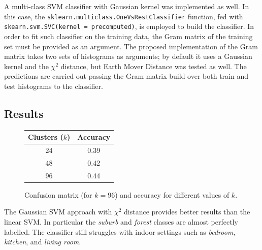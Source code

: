 \documentclass[12pt]{article}
\begin{document}
  A multi-class SVM classifier with Gaussian kernel was implemented as well. In this case, the \texttt{sklearn.multiclass.OneVsRestClassifier} function, fed with \texttt{skearn.svm.SVC(kernel = precomputed)}, is employed to build the classifier. In order to fit such classifier on the training data, the Gram matrix of the training set must be provided as an argument. The proposed implementation of the Gram matrix takes two sets of histograms as arguments; by default it uses a Gaussian kernel and the \( \chi^2 \) distance, but Earth Mover Distance was tested as well. The predictions are carried out passing the Gram matrix build over both train and test histograms to the classifier.


  \subsection*{Results}

  \begin{figure}[H]
    \centering
    \caption*{Confusion matrix (for \( k = 96 \)) and accuracy for different values of \( k \).}
    \quad\quad\quad
    \begin{tabular}[b]{cc}
			\toprule
      Clusters (\( k \)) & Accuracy \\
      \midrule
      24  & 0.39 \\
      48  & 0.42 \\
      96  & 0.44 \\
      \bottomrule
    \end{tabular}
  \end{figure}

  The Gaussian SVM approach with \( \chi^2 \) distance provides better results than the linear SVM. In particular the \textit{suburb} and \textit{forest} classes are almost perfectly labelled. The classifier still struggles with indoor settings such as \textit{bedroom}, \textit{kitchen}, and \textit{living room}.
\end{document}
